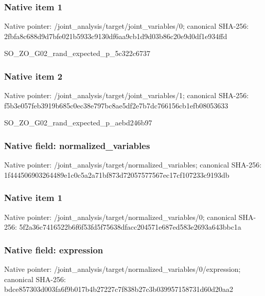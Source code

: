 \documentclass[10pt,a4paper]{article}
\begin{document}
\subsubsection{Native item 1}
Native pointer: /joint\_\allowbreak{}analysis/target/joint\_\allowbreak{}variables/0; canonical SHA-256: 2fbfa8c688d9d7bfe021b5933c9130df6aa9cb1d9d03b86c20e9d0df1e934ffd

\begingroup\raggedright\sloppy SO\_\allowbreak{}ZO\_\allowbreak{}G02\_\allowbreak{}rand\_\allowbreak{}expected\_\allowbreak{}p\_\allowbreak{}5c322c6737\par\endgroup

\subsubsection{Native item 2}
Native pointer: /joint\_\allowbreak{}analysis/target/joint\_\allowbreak{}variables/1; canonical SHA-256: f5b3e057feb3919b685c0ec38e797bc8ae5df2e7b7dc766156cb1efb08053633

\begingroup\raggedright\sloppy SO\_\allowbreak{}ZO\_\allowbreak{}G02\_\allowbreak{}rand\_\allowbreak{}expected\_\allowbreak{}p\_\allowbreak{}aebd246b97\par\endgroup

\subsubsection{Native field: normalized\_\allowbreak{}variables}
Native pointer: /joint\_\allowbreak{}analysis/target/normalized\_\allowbreak{}variables; canonical SHA-256: 1f444506903264489e1c0c5a2a71bf873d72057577567ec17cf107233c9193db

\subsubsection{Native item 1}
Native pointer: /joint\_\allowbreak{}analysis/target/normalized\_\allowbreak{}variables/0; canonical SHA-256: 5f2a36c7416522b6f6f53fd5f75638dfacc204571e687ed583e2693a643bbc1a

\subsubsection{Native field: expression}
Native pointer: /joint\_\allowbreak{}analysis/target/normalized\_\allowbreak{}variables/0/expression; canonical SHA-256: bdce857303d003fa6f9b017b4b27227c7f838b27c3b039957158731d60d20aa2
\end{document}
